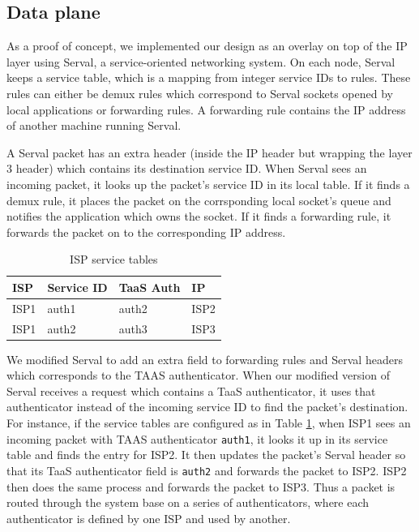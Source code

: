\documentclass{article}
\begin{document}
\subsection{Data plane}
As a proof of concept, we implemented our design as an overlay on top
of the IP layer using Serval, a service-oriented networking system. On
each node, Serval keeps a service table, which is a mapping from
integer service IDs to rules. These rules can either be demux rules
which correspond to Serval sockets opened by local applications or
forwarding rules. A forwarding rule contains the IP address of another
machine running Serval.

A Serval packet has an extra header (inside the IP header but wrapping
the layer 3 header) which contains its destination service ID. When
Serval sees an incoming packet, it looks up the packet's service ID in
its local table. If it finds a demux rule, it places the packet on
the corrsponding local socket's queue and notifies the application
which owns the socket. If it finds a forwarding rule, it forwards the
packet on to the corresponding IP address.

\begin{table}
\centering
\begin{tabular}{| l | l | l | l | }
  \hline
  ISP & Service ID & TaaS Auth & IP \\ \hline
  ISP1 & auth1 & auth2 & ISP2 \\ \hline
  ISP1 & auth2 & auth3 & ISP3 \\ \hline
\end{tabular}
\caption{ISP service tables}
\label{table:servicetables}
\end{table}

We modified Serval to add an extra field to forwarding rules and
Serval headers which corresponds to the TAAS authenticator. When our
modified version of Serval receives a request which contains a TaaS
authenticator, it uses that authenticator instead of the incoming
service ID to find the packet's destination. For instance, if the
service tables are configured as in Table \ref{table:servicetables},
when ISP1 sees an incoming packet with TAAS authenticator
\texttt{auth1}, it looks it up in its service table and finds the
entry for ISP2. It then updates the packet's Serval header so that its
TaaS authenticator field is \texttt{auth2} and forwards the packet to
ISP2. ISP2 then does the same process and forwards the packet to
ISP3. Thus a packet is routed through the system base on a series of
authenticators, where each authenticator is defined by one ISP and
used by another.
\end{document}
